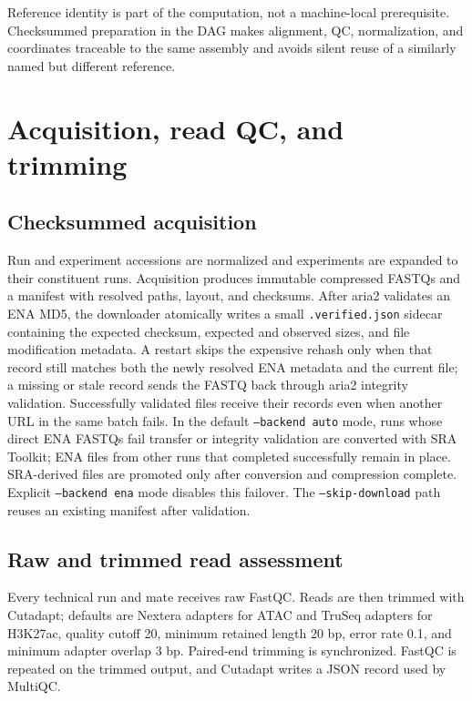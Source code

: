 \documentclass[11pt]{article}
\newcommand{\software}[1]{\textsf{#1}}
\begin{document}
Reference identity is part of the computation, not a machine-local
prerequisite.  Checksummed preparation in the DAG makes alignment, QC,
normalization, and coordinates traceable to the same assembly and avoids
silent reuse of a similarly named but different reference.

\section{Acquisition, read QC, and trimming}

\subsection{Checksummed acquisition}

Run and experiment accessions are normalized and experiments are expanded to
their constituent runs.  Acquisition produces immutable compressed FASTQs and
a manifest with resolved paths, layout, and checksums.  After \software{aria2}
validates an ENA MD5, the downloader atomically writes a small
\texttt{.verified.json} sidecar containing the expected checksum, expected and
observed sizes, and file modification metadata.  A restart skips the expensive
rehash only when that record still matches both the newly resolved ENA
metadata and the current file; a missing or stale record sends the FASTQ back
through \software{aria2} integrity validation.  Successfully validated files
receive their records even when another URL in the same batch fails.
In the default \texttt{--backend auto} mode, runs whose direct ENA FASTQs fail
transfer or integrity validation are converted with SRA Toolkit; ENA files
from other runs that completed successfully remain in place.  SRA-derived
files are promoted only after conversion and compression complete.  Explicit
\texttt{--backend ena} mode disables this failover.  The
\texttt{--skip-download} path reuses an existing manifest after validation.

\subsection{Raw and trimmed read assessment}

Every technical run and mate receives raw \software{FastQC}.  Reads are then
trimmed with \software{Cutadapt}; defaults are Nextera adapters for ATAC and
TruSeq adapters for H3K27ac, quality cutoff 20, minimum retained length 20 bp,
error rate 0.1, and minimum adapter overlap 3 bp.  Paired-end trimming is
synchronized.  FastQC is repeated on the trimmed output, and Cutadapt writes a
JSON record used by MultiQC.
\end{document}
